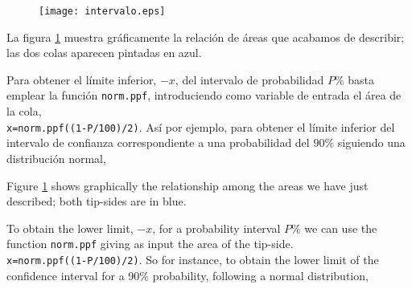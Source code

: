 \begin{figure}[h]
\centering
\texttt{[image: intervalo.eps]}
\label{fig:intervalo}
\end{figure}
\begin{paracol}{2}
La figura \ref{fig:intervalo} muestra gráficamente la relación de áreas que acabamos de describir; las dos colas aparecen pintadas en azul. 

Para obtener el límite inferior, $-x$, del intervalo de probabilidad $P\%$ basta emplear la función \texttt{norm.ppf}, introduciendo como variable de entrada el área de la cola,\\ \texttt{x=norm.ppf((1-P/100)/2)}. Así por ejemplo, para obtener el límite inferior del intervalo de confianza correspondiente a una probabilidad del $90\%$ siguiendo una distribución normal,

\switchcolumn
Figure \ref{fig:intervalo} shows graphically the relationship among the areas we have just described; both tip-sides are in blue.

To obtain the lower limit, $-x$, for a probability interval $P\%$ we can use the function \texttt{norm.ppf} giving as input the area of the tip-side.\\
\texttt{x=norm.ppf((1-P/100)/2)}. So for instance, to obtain the lower limit of the confidence interval for a 90\% probability, following a normal distribution,  
\end{paracol}

